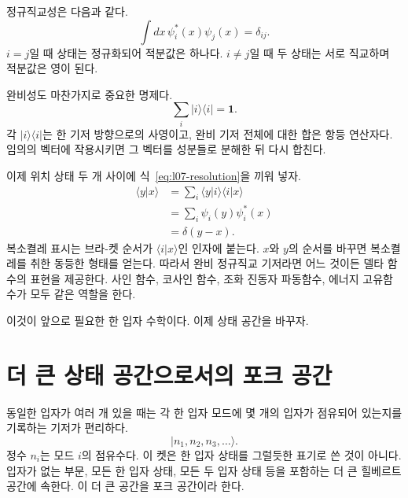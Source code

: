 정규직교성은 다음과 같다.
\begin{equation}
\int dx\,\psi_i^*(x)\psi_j(x)=\delta_{ij}.
\label{eq:l07-orthonormality}
\end{equation}
\(i=j\)일 때 상태는 정규화되어 적분값은 하나다. \(i\ne j\)일 때 두 상태는 서로 직교하며 적분값은 영이 된다.

완비성도 마찬가지로 중요한 명제다.
\begin{equation}
\sum_i |i\rangle\langle i|=\mathbf 1.
\label{eq:l07-resolution}
\end{equation}
각 \(|i\rangle\langle i|\)는 한 기저 방향으로의 사영이고, 완비 기저 전체에 대한 합은 항등 연산자다. 임의의 벡터에 작용시키면 그 벡터를 성분들로 분해한 뒤 다시 합친다.

이제 위치 상태 두 개 사이에 식~\eqref{eq:l07-resolution}을 끼워 넣자.
\begin{align}
\langle y|x\rangle
&=\sum_i\langle y|i\rangle\langle i|x\rangle \\
&=\sum_i\psi_i(y)\psi_i^*(x) \\
&=\delta(y-x).
\label{eq:l07-position-completeness}
\end{align}
복소켤레 표시는 브라-켓 순서가 \(\langle i|x\rangle\)인 인자에 붙는다. \(x\)와 \(y\)의 순서를 바꾸면 복소켤레를 취한 동등한 형태를 얻는다. 따라서 완비 정규직교 기저라면 어느 것이든 델타 함수의 표현을 제공한다. 사인 함수, 코사인 함수, 조화 진동자 파동함수, 에너지 고유함수가 모두 같은 역할을 한다.

\begin{classroomqa}
\end{classroomqa}

이것이 앞으로 필요한 한 입자 수학이다. 이제 상태 공간을 바꾸자.

\section{더 큰 상태 공간으로서의 포크 공간}

동일한 입자가 여러 개 있을 때는 각 한 입자 모드에 몇 개의 입자가 점유되어 있는지를 기록하는 기저가 편리하다.
\begin{equation}
|n_1,n_2,n_3,\ldots\rangle.
\label{eq:l07-fock-basis}
\end{equation}
정수 \(n_i\)는 모드 \(i\)의 점유수다. 이 켓은 한 입자 상태를 그럴듯한 표기로 쓴 것이 아니다. 입자가 없는 부문, 모든 한 입자 상태, 모든 두 입자 상태 등을 포함하는 더 큰 힐베르트 공간에 속한다. 이 더 큰 공간을 포크 공간이라 한다.

